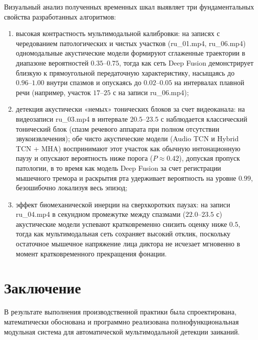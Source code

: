 \documentclass[a4paper,14pt]{extarticle}
\begin{document}
	Визуальный анализ полученных временных шкал выявляет три фундаментальных свойства разработанных алгоритмов:
	\begin{enumerate}
		\item высокая контрастность мультимодальной калибровки: на записях с чередованием патологических и чистых участков (ru\_01.mp4, ru\_06.mp4) одномодальные акустические модели формируют сглаженные траектории в диапазоне вероятностей $0.35\text{--}0.75$, тогда как сеть Deep Fusion демонстрирует близкую к прямоугольной передаточную характеристику, насыщаясь до $0.96\text{--}1.00$ внутри спазмов и опускаясь до $0.02\text{--}0.05$ на интервалах плавной речи (например, участок $17\text{--}25$ с на записи ru\_06.mp4);
		\item детекция акустически «немых» тонических блоков за счет видеоканала: на видеозаписи ru\_03.mp4 в интервале $20.5\text{--}23.5$ с наблюдается классический тонический блок (спазм речевого аппарата при полном отсутствии звукоизвлечения); обе чисто акустические модели (Audio TCN и Hybrid TCN + MHA) воспринимают этот участок как обычную интонационную паузу и опускают вероятность ниже порога ($P \approx 0.42$), допуская пропуск патологии, в то время как модель Deep Fusion за счет регистрации мышечного тремора и раскрытия рта удерживает вероятность на уровне $0.99$, безошибочно локализуя весь эпизод;
		\item эффект биомеханической инерции на сверхкоротких паузах: на записи ru\_04.mp4 в секундном промежутке между спазмами ($22.0\text{--}23.5$ с) акустические модели успевают кратковременно снизить оценку ниже $0.5$, тогда как мультимодальная сеть сохраняет высокий отклик, поскольку остаточное мышечное напряжение лица диктора не исчезает мгновенно в момент кратковременного прекращения фонации.
	\end{enumerate}
	
	\newpage
	\section*{Заключение}
	
	В результате выполнения производственной практики была спроектирована, математически обоснована и программно реализована полнофункциональная модульная система для автоматической мультимодальной детекции заиканий.
	
\end{document}

